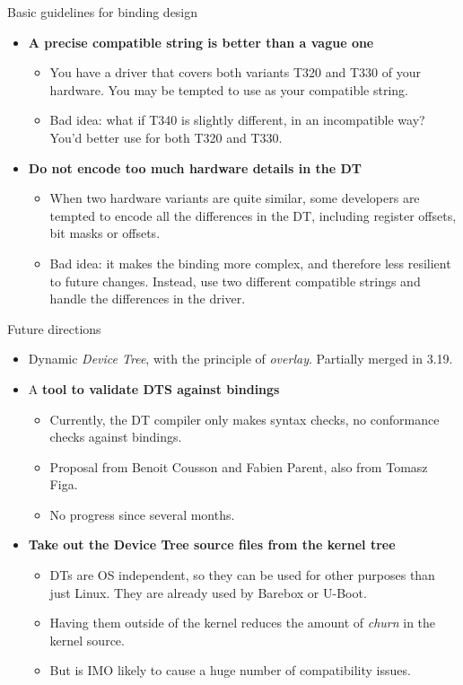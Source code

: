 \documentclass[obeyspaces,spaces,hyphens]{beamer}
\begin{document}
\begin{frame}{Basic guidelines for binding design}
  \begin{itemize}
  \item {\bf A precise compatible string is better than a vague one}
    \begin{itemize}
    \item You have a driver that covers both variants T320 and T330 of
      your hardware. You may be tempted to use  as your
      compatible string.
    \item Bad idea: what if T340 is slightly different, in an
      incompatible way? You'd better use  for both T320
      and T330.
    \end{itemize}
  \item {\bf Do not encode too much hardware details in the DT}
    \begin{itemize}
    \item When two hardware variants are quite similar, some
      developers are tempted to encode all the differences in the DT,
      including register offsets, bit masks or offsets.
    \item Bad idea: it makes the binding more complex, and therefore
      less resilient to future changes. Instead, use two different
      compatible strings and handle the differences in the driver.
    \end{itemize}
  \end{itemize}
\end{frame}

\begin{frame}{Future directions}
  \begin{itemize}
  \item Dynamic {\em Device Tree}, with the principle of {\em
      overlay}. Partially merged in 3.19.
  \item A {\bf tool to validate DTS against bindings}
    \begin{itemize}
    \item Currently, the DT compiler only makes syntax checks, no
      conformance checks against bindings.
    \item Proposal from Benoit Cousson and Fabien Parent, also from
      Tomasz Figa.
    \item No progress since several months.
    \end{itemize}
  \item {\bf Take out the Device Tree source files from the kernel tree}
    \begin{itemize}
    \item DTs are OS independent, so they can be used for other
      purposes than just Linux. They are already used by Barebox or
      U-Boot.
    \item Having them outside of the kernel reduces the amount of {\em
        churn} in the kernel source.
    \item But is IMO likely to cause a huge number of compatibility
      issues.
    \end{itemize}
  \end{itemize}
\end{frame}
\end{document}
